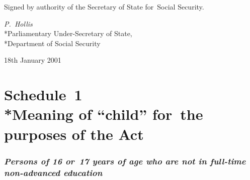 \documentclass[12pt,a4paper]{article}
\begin{document}
Signed 
by authority of the Secretary of State for~Social Security.

{\raggedleft
\emph{P.~Hollis}\\*Parliamentary Under-Secretary of State,\\*Department of Social Security

}

18th January 2001

\vfill

\small

\part[Schedule~1 --- Meaning of “child” for~the purposes of the Act]{Schedule~1\\*Meaning of “child” for~the purposes of the Act}

\renewcommand\parthead{--- Schedule~1}

\section*{\itshape Persons of 16 or~17 years of age who are not in full-time non-advanced education}
\end{document}
